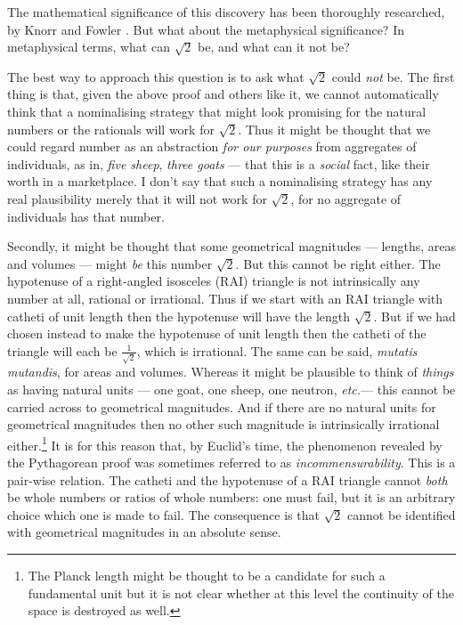 \documentclass[11pt,oneside,a4paper]{article}
\makeatletter
\newcommand*{\sqrtwo}{\ensuremath{\sqrt{2}}\hspace{0.5ex}\xspace}
\newcommand{\etc}{\hspace{1pt}\textit{etc.}\@\xspace}
\makeatother
\begin{document}
The mathematical significance of this discovery has been thoroughly researched, by Knorr \parencite*{knorr_evolution_1975} and Fowler \parencite*{fowler_mathematics_1999}. But what about the metaphysical significance? In metaphysical terms, what can \sqrtwo be, and what can it not be?

The best way to approach this question is to ask what \sqrtwo could \textit{not} be. The first thing is that, given the above proof and others like it, we cannot automatically think that a nominalising strategy that might look promising for the natural numbers or the rationals will work for  \sqrtwo. Thus it might be thought that we could regard number as an abstraction \textit{for our purposes} from aggregates of individuals, as in, \textit{five sheep}, \textit{three goats} --- that this is a \textit{social} fact, like their worth in a marketplace. I don't say that such a nominalising strategy has any real plausibility merely that it will not work for \sqrtwo, for no aggregate of individuals has that number. 

Secondly, it might be thought that some geometrical magnitudes --- lengths, areas and volumes --- might \textit{be} this number \sqrtwo. But this cannot be right either. The hypotenuse of a right-angled isosceles (RAI) triangle is not intrinsically any number at all, rational or irrational. Thus if we start with an RAI triangle with catheti of unit length then the hypotenuse will have the length \sqrtwo. But if we had chosen instead to make the hypotenuse of unit length then the catheti of the triangle will each be $\frac{1}{\sqrt{2}}$, which is irrational. The same can be said, \textit{mutatis mutandis}, for areas and volumes. Whereas it might be plausible to think of \textit{things} as having natural units --- one goat, one sheep, one neutron, \etc --- this cannot be carried across to geometrical magnitudes. And if there are no natural units for geometrical magnitudes then no other such magnitude is intrinsically irrational either.\footnote{The Planck length might be thought to be a candidate for such a fundamental unit but it is not clear whether at this level the continuity of the space is destroyed as well.} It is for this reason that, by Euclid's time, the phenomenon revealed by the Pythagorean proof was sometimes referred to as \textit{incommensurability}. This is a pair-wise relation. The catheti and the hypotenuse of a RAI triangle cannot \textit{both} be whole numbers or ratios of whole numbers: one must fail, but it is an arbitrary choice which one is made to fail. The consequence is that \sqrtwo cannot be identified with geometrical magnitudes in an absolute sense.
\end{document}
